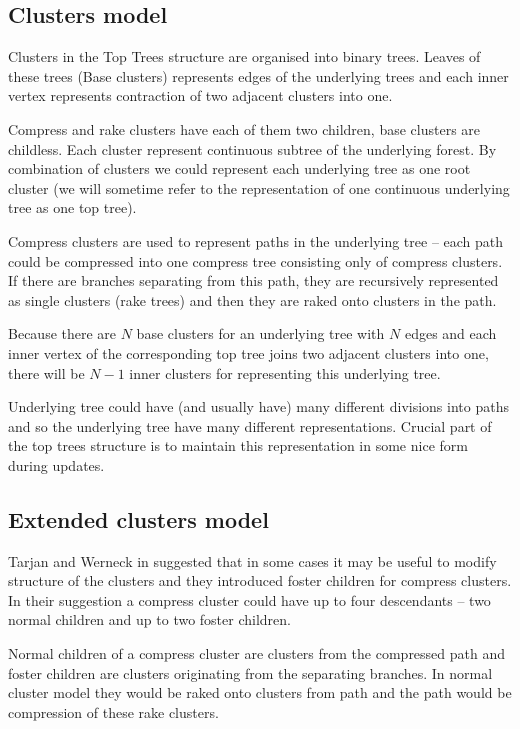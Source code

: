\subsection{Clusters model}

Clusters in the Top Trees structure are organised into binary trees. Leaves of
these trees (Base clusters) represents edges of the underlying trees and each
inner vertex represents contraction of two adjacent clusters into one.

Compress and rake clusters have each of them two children, base clusters are
childless. Each cluster represent continuous subtree of the underlying forest.
By combination of clusters we could represent each underlying tree as one {\I
root cluster} (we will sometime refer to the representation of one continuous
underlying tree as one {\I top tree}).

Compress clusters are used to represent paths in the underlying tree -- each
path could be compressed into one {\I compress tree} consisting only of compress
clusters. If there are branches separating from this path, they are recursively
represented as single clusters ({\I rake trees}) and then they are
{\I raked onto} clusters in the path.

Because there are $N$ base clusters for an underlying tree with $N$ edges and
each inner vertex of the corresponding top tree joins two adjacent clusters into
one, there will be $N-1$ inner clusters for representing this underlying tree.

Underlying tree could have (and usually have) many different divisions into
paths and so the underlying tree have many different representations. Crucial
part of the top trees structure is to maintain this representation in some nice
form during updates.

\subsection{Extended clusters model}

Tarjan and Werneck in \cite{SelfAdjustingTT} suggested that in some cases it may
be useful to modify structure of the clusters and they introduced
{\I foster children} for {\I compress clusters}. In their suggestion a compress
cluster could have up to four descendants -- two normal children and up to two
foster children.

Normal children of a compress cluster are clusters from the compressed path and
foster children are clusters originating from the separating branches. In normal
cluster model they would be raked onto clusters from path and the path would be
compression of these rake clusters.

